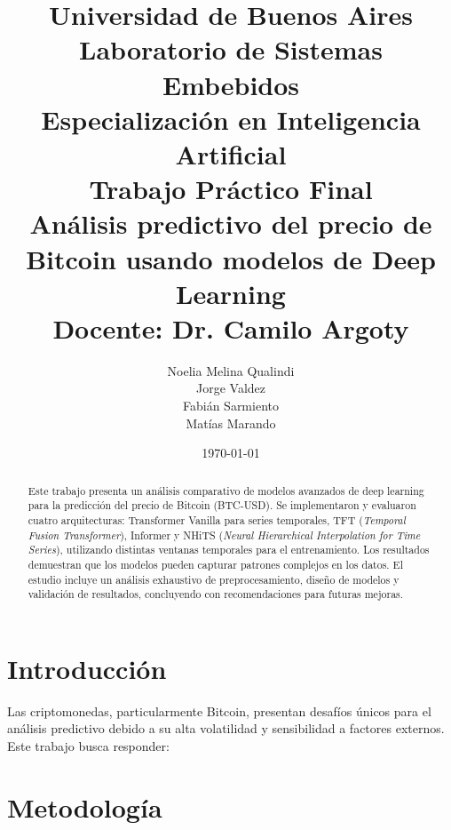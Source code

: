 \documentclass[12pt]{article}
\title{
    \vspace{-2cm}
    \normalsize \textbf{Universidad de Buenos Aires} \\
    \textbf{Laboratorio de Sistemas Embebidos} \\
    \textbf{Especialización en Inteligencia Artificial} \\
    \vspace{0.5cm}
    {Trabajo Práctico Final} \\
    \vspace{1cm}
    \Large \textbf{Análisis predictivo del precio de Bitcoin usando modelos de Deep Learning} \\
    \vspace{1cm}
    \large Docente: Dr. Camilo Argoty
    \vspace{1cm}
}
\author{
    Noelia Melina Qualindi \\
    Jorge Valdez \\
    Fabián Sarmiento \\
    Matías Marando
    \vspace{1cm}
}
\date{\today}
\begin{document}
\maketitle


\begin{abstract}
Este trabajo presenta un análisis comparativo de modelos avanzados de deep learning para la predicción del precio de Bitcoin (BTC-USD).
Se implementaron y evaluaron cuatro arquitecturas: Transformer Vanilla para series temporales, TFT (\textit{Temporal Fusion Transformer}),
Informer y NHiTS (\textit{Neural Hierarchical Interpolation for Time Series}), utilizando distintas ventanas temporales para el entrenamiento.
Los resultados demuestran que los modelos pueden capturar patrones complejos en los datos. %
El estudio incluye un análisis exhaustivo de preprocesamiento, diseño de modelos y validación de resultados, concluyendo con recomendaciones para futuras mejoras.
\end{abstract}


\newpage
\section{Introducción}
\label{sec:intro}

Las criptomonedas, particularmente Bitcoin, presentan desafíos únicos para el análisis predictivo debido a su alta volatilidad y sensibilidad a factores externos. Este trabajo busca responder:

\begin{center}
\end{center}


\newpage
\section{Metodología}
\label{sec:metodologia}
\end{document}
